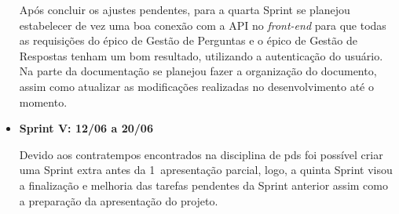\begin{itemize}
Após concluir os ajustes pendentes, para a quarta \gls{Sprint} se planejou estabelecer de vez uma boa conexão com a API no \textsl{\gls{front-end}} para que todas as requisições do épico de Gestão de Perguntas e o épico de Gestão de Respostas tenham um bom resultado, utilizando a autenticação do usuário. Na parte da documentação se planejou fazer a organização do documento, assim como atualizar as modificações realizadas no desenvolvimento até o momento. 
\item {\textbf{Sprint V: 12/06 a 20/06}}

Devido aos contratempos encontrados na disciplina de \acs{pds} foi possível criar uma \gls{Sprint} extra antes da  1\textordmasculine \, apresentação parcial, logo, a quinta \gls{Sprint} visou a finalização e melhoria das tarefas pendentes da \gls{Sprint} anterior assim como a preparação da apresentação do projeto. 
\end{itemize}


